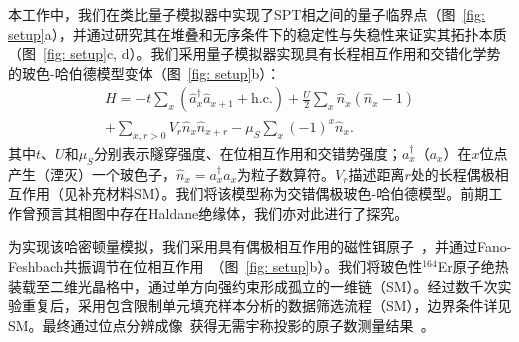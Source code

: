\documentclass[preprint,superscriptaddress,floatfix, nofootinbib]{revtex4-2}
\begin{document}
\begin{CJK*}{UTF8}{gbsn}
本工作中，我们在类比量子模拟器中实现了SPT相之间的量子临界点（图~\ref{fig: setup}a），并通过研究其在堆叠和无序条件下的稳定性与失稳性来证实其拓扑本质（图~\ref{fig: setup}c, d）。我们采用量子模拟器\cite{Bloch2008, Gross2017, Bohrdt2021}实现具有长程相互作用和交错化学势的玻色-哈伯德模型变体（图~\ref{fig: setup}b）：
\begin{equation}
\label{eq: Hamiltonian}
\begin{split}
H=-t\sum_{x}(\hat{a}_x^\dag \hat{a}_{x + 1}+\mathrm{h.c.})+\frac{U}{2}\sum_x\hat{n}_x(\hat{n}_x-1) \\
+\sum_{x, r>0}V_{r}\hat{n}_x\hat{n}_{x + r} - \mu_S\sum_x(-1)^x\hat{n}_x.
\end{split}
\end{equation}
其中$t$、$U$和$\mu_S$分别表示隧穿强度、在位相互作用和交错势强度；$a_x^{\dagger}$（$a_x$）在$x$位点产生（湮灭）一个玻色子，$\hat{n}_x = a_x^{\dagger} a_x$为粒子数算符。$V_r$描述距离$r$处的长程偶极相互作用（见补充材料SM）。我们将该模型称为交错偶极玻色-哈伯德模型。前期工作\cite{Torre2006,Berg2008}曾预言其相图中存在Haldane绝缘体\cite{Haldane1983}，我们亦对此进行了探究。

为实现该哈密顿量模拟，我们采用具有偶极相互作用的磁性铒原子~\cite{Su2023}，并通过Fano-Feshbach共振调节在位相互作用~\cite{Chin2010}（图~\ref{fig: setup}b）。我们将玻色性$^{164}$Er原子绝热装载至二维光晶格中，通过单方向强约束形成孤立的一维链（SM）。经过数千次实验重复后，采用包含限制单元填充样本分析的数据筛选流程（SM），边界条件详见SM。最终通过位点分辨成像~\cite{Bakr2010, Sherson2010}获得无需宇称投影的原子数测量结果~\cite{Su2024}。

\end{CJK*}
\end{document}
